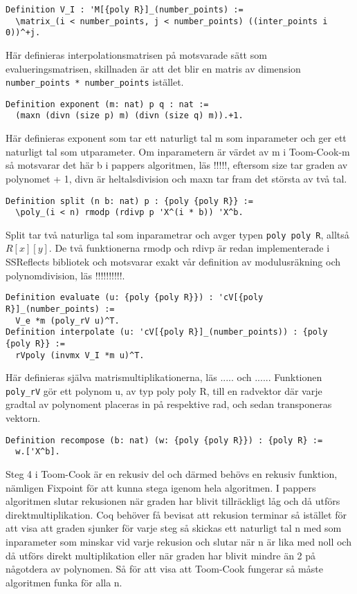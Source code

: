 \begin{verbatim}
Definition V_I : 'M[{poly R}]_(number_points) :=
  \matrix_(i < number_points, j < number_points) ((inter_points i 0))^+j.
\end{verbatim}
Här definieras interpolationsmatrisen på motsvarade sätt som
evalueringsmatrisen, skillnaden är att det blir en matris av dimension
\verb+number_points * number_points+ istället.

\begin{verbatim}
Definition exponent (m: nat) p q : nat :=
  (maxn (divn (size p) m) (divn (size q) m)).+1.
\end{verbatim}
Här definieras exponent som tar ett naturligt tal m som inparameter och ger ett
naturligt tal som utparameter. Om inparametern är värdet av m i Toom-Cook-m så
motsvarar det här b i pappers algoritmen, läs !!!!!, eftersom size tar graden
av polynomet + 1, divn är heltalsdivision och maxn tar fram det största av två
tal.
\begin{verbatim}
Definition split (n b: nat) p : {poly {poly R}} :=
  \poly_(i < n) rmodp (rdivp p 'X^(i * b)) 'X^b.
\end{verbatim}
Split tar två naturliga tal som inparametrar och avger typen \verb+poly poly R+,
alltså $R[x][y]$. De två funktionerna rmodp och rdivp är redan
implementerade i SSReflects bibliotek och motsvarar exakt vår definition av
modulusräkning och polynomdivision, läs !!!!!!!!!!.
\begin{verbatim}
Definition evaluate (u: {poly {poly R}}) : 'cV[{poly R}]_(number_points) :=
  V_e *m (poly_rV u)^T.
Definition interpolate (u: 'cV[{poly R}]_(number_points)) : {poly {poly R}} :=
  rVpoly (invmx V_I *m u)^T.
\end{verbatim}
Här definieras själva matrismultiplikationerna, läs ..... och ...... Funktionen
\verb+poly_rV+ gör ett polynom u, av typ poly poly R, till en radvektor där
varje gradtal av polynoment placeras in på respektive rad, och sedan
transponeras vektorn.
\begin{verbatim}
Definition recompose (b: nat) (w: {poly {poly R}}) : {poly R} :=
  w.['X^b].
\end{verbatim}
Steg 4 i Toom-Cook är en rekusiv del och därmed behövs en rekusiv funktion,
nämligen Fixpoint för att kunna stega igenom hela algoritmen. I pappers
algoritmen slutar rekusionen när graden har blivit tillräckligt låg och då
utförs direktmultiplikation. Coq behöver få bevisat att rekusion terminar så
istället för att visa att graden sjunker för varje steg så skickas ett
naturligt tal n med som inparameter som minskar vid varje rekusion och slutar
när n är lika med noll och då utförs direkt multiplikation eller när graden har
blivit mindre än 2 på någotdera av polynomen. Så för att visa att Toom-Cook
fungerar så måste algoritmen funka för alla n.

